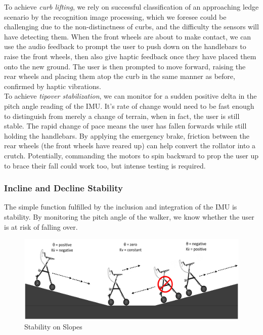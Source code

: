 \noindent To achieve \textit{curb lifting}, we rely on successful classification of an approaching ledge scenario by the recognition image processing, which we foresee could be challenging due to the non-distinctness of curbs, and the difficulty the sensors will have detecting them. When the front wheels are about to make contact, we can use the audio feedback to prompt the user to push down on the handlebars to raise the front wheels, then also give haptic feedback once they have placed them onto the new ground. The user is then prompted to move forward, raising the rear wheels and placing them atop the curb in the same manner as before, confirmed by haptic vibrations.\\

\noindent To achieve \textit{tipover stabilization}, we can monitor for a sudden positive delta in the pitch angle reading of the IMU. It's rate of change would need to be fast enough to distinguish from merely a change of terrain, when in fact, the user is still stable. The rapid change of pace means the user has fallen forwards while still holding the handlebars. By applying the emergency brake, friction between the rear wheels (the front wheels have reared up) can help convert the rollator into a crutch. Potentially, commanding the motors to spin backward to prop the user up to brace their fall could work too, but intense testing is required.\\

\subsubsection{Incline and Decline Stability}
\noindent The simple function fulfilled by the inclusion and integration of the IMU is stability. By monitoring the pitch angle of the walker, we know whether the user is at risk of falling over.\\

\begin{figure}[H]
	\centering
	\includegraphics[width=\textwidth]{./Images/Incline-Decline-Stability.png}
	\caption{\label{fig:slope-stability}Stability on Slopes}
\end{figure}

